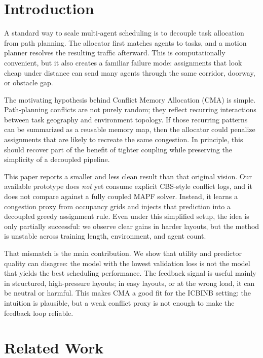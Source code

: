 \section{Introduction}
\label{sec:intro}

A standard way to scale multi-agent scheduling is to decouple task allocation from path planning. The allocator first matches agents to tasks, and a motion planner resolves the resulting traffic afterward. This is computationally convenient, but it also creates a familiar failure mode: assignments that look cheap under distance can send many agents through the same corridor, doorway, or obstacle gap.

The motivating hypothesis behind Conflict Memory Allocation (CMA) is simple. Path-planning conflicts are not purely random; they reflect recurring interactions between task geography and environment topology. If those recurring patterns can be summarized as a reusable memory map, then the allocator could penalize assignments that are likely to recreate the same congestion. In principle, this should recover part of the benefit of tighter coupling while preserving the simplicity of a decoupled pipeline.

This paper reports a smaller and less clean result than that original vision. Our available prototype does \emph{not} yet consume explicit CBS-style conflict logs, and it does not compare against a fully coupled MAPF solver. Instead, it learns a congestion proxy from occupancy grids and injects that prediction into a decoupled greedy assignment rule. Even under this simplified setup, the idea is only partially successful: we observe clear gains in harder layouts, but the method is unstable across training length, environment, and agent count.

That mismatch is the main contribution. We show that utility and predictor quality can disagree: the model with the lowest validation loss is not the model that yields the best scheduling performance. The feedback signal is useful mainly in structured, high-pressure layouts; in easy layouts, or at the wrong load, it can be neutral or harmful. This makes CMA a good fit for the ICBINB setting: the intuition is plausible, but a weak conflict proxy is not enough to make the feedback loop reliable.

\section{Related Work}
\label{sec:related}

